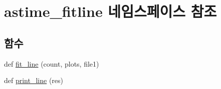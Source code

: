 \hypertarget{namespaceastime__fitline}{}\section{astime\+\_\+fitline 네임스페이스 참조}
\label{namespaceastime__fitline}
\subsection*{함수}
\begin{DoxyCompactItemize}
\item 
def \hyperlink{namespaceastime__fitline_aa22d126809119d4540a1f8700dbebf88}{fit\+\_\+line} (count, plots, file1)
\item 
def \hyperlink{namespaceastime__fitline_ac014d6b638abed2e6ae5d6f9af328b6b}{print\+\_\+line} (res)
\end{DoxyCompactItemize}
